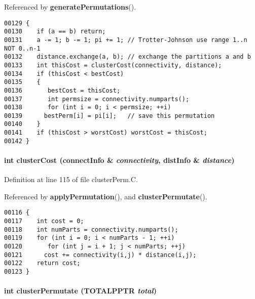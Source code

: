 Referenced by {\bf generate\-Permutations}().\small\begin{verbatim}00129 {
00130    if (a == b) return;
00131    a -= 1; b -= 1; pi += 1; // Trotter-Johnson use range 1..n NOT 0..n-1
00132    distance.exchange(a, b); // exchange the partitions a and b
00133    int thisCost = clusterCost(connectivity, distance);
00134    if (thisCost < bestCost)
00135    {
00136       bestCost = thisCost;
00137       int permsize = connectivity.numparts();
00138       for (int i = 0; i < permsize; ++i)
00139      bestPerm[i] = pi[i];   // save this permutation
00140    }
00141    if (thisCost > worstCost) worstCost = thisCost;
00142 }
\end{verbatim}\normalsize 
\label{clusterPerm.C_a2}
\paragraph{\setlength{\rightskip}{0pt plus 5cm}int cluster\-Cost ({\bf connect\-Info} \& {\em connectivity}, {\bf dist\-Info} \& {\em distance})}\hfill



Definition at line 115 of file cluster\-Perm.C.

Referenced by {\bf apply\-Permutation}(), and {\bf cluster\-Permutate}().\small\begin{verbatim}00116 {
00117    int cost = 0;
00118    int numParts = connectivity.numparts();
00119    for (int i = 0; i < numParts - 1; ++i)
00120       for (int j = i + 1; j < numParts; ++j)
00121      cost += connectivity(i,j) * distance(i,j);
00122    return cost;
00123 }
\end{verbatim}\normalsize 
\label{clusterPerm.C_a6}
\paragraph{\setlength{\rightskip}{0pt plus 5cm}int cluster\-Permutate ({\bf TOTALPPTR} {\em total})}\hfill



